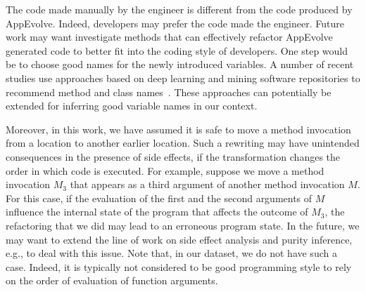\vspace{0.5cm}The code made manually by the engineer is different from the code produced
by AppEvolve. Indeed, developers may prefer the code made the
engineer. Future work may want investigate methods that can effectively
refactor AppEvolve generated code to better fit into the coding style of
developers. One step would be to choose good names for the newly introduced
variables. A number of recent studies use approaches based on deep learning
and mining software repositories to recommend method and class
names~\cite{allamanis2015suggesting}. These approaches can potentially be extended for inferring good
variable names in our context.



Moreover, in this work, we have assumed it is safe to move a method
invocation from a location to another earlier location. Such a rewriting
may have unintended consequences in the presence of side effects, if the
transformation changes the order in which code is executed.  For example,
suppose we move a method invocation $M_3$ that appears as a third argument
of another method invocation $M$. For this case, if the evaluation of the
first and the second arguments of $M$ influence the internal state of the
program that affects the outcome of $M_3$, the refactoring that we did may
lead to an erroneous program state. In the future, we may want to extend
the line of work on side effect analysis and purity inference, e.g., to
deal with this issue. Note that, in our dataset, we do not have such a
case.  Indeed, it is typically not considered to be good programming style
to rely on the order of evaluation of function arguments.





